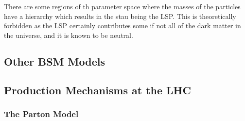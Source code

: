 There are some regions of th parameter space where the masses of the particles have a hierarchy which results in the stau being the LSP. This is theoretically forbidden as the LSP certainly contributes some if not all of the dark matter in the universe, and it is known to be neutral. 



\subsection{Other BSM Models}
\subsection{Production Mechanisms at the LHC}
\subsubsection{The Parton Model}



